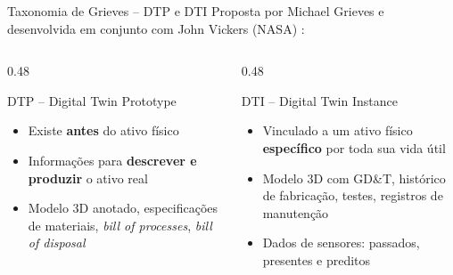 \documentclass[aspectratio=169,xcolor=dvipsnames]{beamer}
\begin{document}
\begin{frame}{Taxonomia de Grieves -- DTP e DTI}
    \footnotesize
    Proposta por Michael Grieves e desenvolvida em conjunto com John Vickers (NASA) \cite{grieves2017dt}:

    \vspace{0.3em}
    \begin{columns}[T]
        \begin{column}{0.48\textwidth}
            \begin{alertblock}{DTP -- Digital Twin Prototype}
                \footnotesize
                \begin{itemize}\setlength\itemsep{1pt}
                    \item Existe \textbf{antes} do ativo físico
                    \item Informações para \textbf{descrever e produzir} o ativo real
                    \item Modelo 3D anotado, especificações de materiais, \emph{bill of processes}, \emph{bill of disposal}
                \end{itemize}
            \end{alertblock}
        \end{column}
        \begin{column}{0.48\textwidth}
            \begin{exampleblock}{DTI -- Digital Twin Instance}
                \footnotesize
                \begin{itemize}\setlength\itemsep{1pt}
                    \item Vinculado a um ativo físico \textbf{específico} por toda sua vida útil
                    \item Modelo 3D com GD\&T, histórico de fabricação, testes, registros de manutenção
                    \item Dados de sensores: passados, presentes e preditos
                \end{itemize}
            \end{exampleblock}
        \end{column}
    \end{columns}

    \vspace{0.3em}
    \centering
\end{frame}
\end{document}
